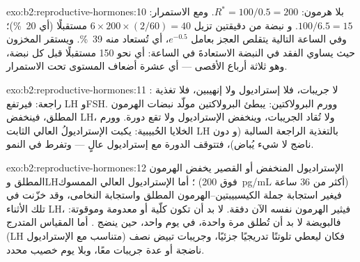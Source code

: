 \begin{solution}{exo:b2:reproductive-hormones:10}
بلا هرمون: $R^* = 100/0.5 = 200$. ومع الاستمرار: $100/6.5 = 15$. و
نبضة من دقيقتين تزيل $6\times 200\times(2/60) = 40$ مستقبلًا
(أي \qty{20}{\%})؛ وفي الساعة التالية يتقلص العجز بعامل
$e^{-0.5}$، أي تُستعاد منه \qty{39}{\%}. ويستقر المخزون
حيث يساوي الفقد في النبضة الاستعادةَ في الساعة:
أي نحو 150 مستقبلًا قبل كل نبضة، وهو ثلاثة أرباع
الأقصى --- أي عشرة أضعاف المستوى تحت الاستمرار.
\end{solution}

\begin{solution}{exo:b2:reproductive-hormones:11}
: لا جريبات، فلا إستراديول ولا إنهيبين، فلا
تغذية راجعة: فيرتفع LH وFSH. وورم البرولاكتين: يبطئ البرولاكتين
مولّد نبضات الهرمون المطلق، فينخفض LH، ولا تُقاد الجريبات،
وينخفض الإستراديول ولا تقع دورة. وورم الخلايا الحُبيبية:
يكبت الإستراديولُ العالي الثابت LH بالتغذية الراجعة السالبة (و
دون  ناضج لا شيء يُباض)، فتتوقف
الدورة مع إستراديول عالٍ --- وتفرط  في النمو.
\end{solution}

\begin{solution}{exo:b2:reproductive-hormones:12}
الإستراديول المنخفض أو القصير يخفض الهرمون المطلق وLH؛ أما
الإستراديول العالي الممسوك (فوق \qty{200}{pg/mL} أكثر من 36 ساعة) فيغير
استجابة جملة الكيسبيبتين--الهرمون المطلق واستجابة النخامى،
وقد خزّنت في تلك الأثناء LH، فيثير الهرمون نفسه الآن
دفقة.  لا بد أن تكون كلّية أو معدومة وموقوتة: فالبويضة
لا بد أن تُطلق مرة واحدة، في يوم واحد، حين ينضج . أما المقياس
المتدرج (LH متناسب مع الإستراديول) فكان ليعطي تلوتنًا تدريجيًا جزئيًا،
وجريبات تبيض نصف ناضجة أو عدة جريبات معًا،
وبلا يوم خصيب محدد.
\end{solution}


